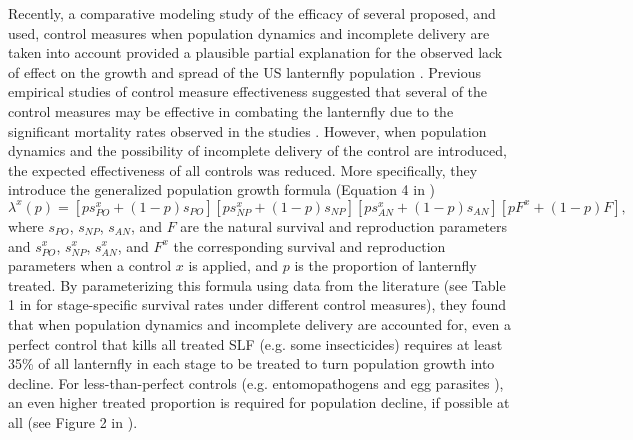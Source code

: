\documentclass[onecolumn]{article}
\begin{document}
Recently, a comparative modeling study of the efficacy of several proposed, and used, control measures when population dynamics and incomplete delivery are taken into account provided a plausible partial explanation for the observed lack of effect on the growth and spread of the US lanternfly population \citep{Strombom2021}. Previous empirical studies of control measure effectiveness suggested that several of the control measures may be effective in combating the lanternfly due to the significant mortality rates observed in the studies \citep{Clifton2020,Cooperband2018,Cooperband2019}. However, when population dynamics and the possibility of incomplete delivery of the control are introduced, the expected effectiveness of all controls was reduced. More specifically, they introduce the generalized population growth formula (Equation 4 in \citep{Strombom2021})
\begin{equation}\label{eq:1} \lambda^x(p)=[ps_{PO}^x+(1-p)s_{PO}][ps_{NP}^x+(1-p)s_{NP}][ps_{AN}^x+(1-p)s_{AN}][pF^x+(1-p)F], \end{equation}
where $s_{PO}$, $s_{NP}$, $s_{AN}$, and $F$ are the natural survival and reproduction parameters and $s^x_{PO}$, $s^x_{NP}$, $s^x_{AN}$, and $F^x$ the corresponding survival and reproduction parameters when a control $x$ is applied, and $p$ is the proportion of lanternfly treated. By parameterizing this formula using data from the literature (see Table 1 in \cite{Strombom2021} for stage-specific survival rates under different control measures), they found that when population dynamics and incomplete delivery are accounted for, even a perfect control that kills all treated SLF (e.g. some insecticides) requires at least 35\% of all lanternfly in each stage to be treated to turn population growth into decline. For less-than-perfect controls (e.g. entomopathogens \citep{Clifton2020} and egg parasites \citep{Liu2019a}), an even higher treated proportion is required for population decline, if possible at all (see Figure 2 in \citep{Strombom2021}).
\end{document}
